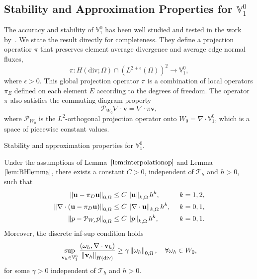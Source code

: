 \subsection{Stability and Approximation Properties for $\mathbb{V}_1^0$}
\label{sec:stabV10}
The accuracy and stability of $\mathbb{V}_1^0$ has been well studied and 
tested in the work by~\cite{directSerendipity}.
We state the result directly for completeness.
They define a projection operatior $\pi$ that preserves element average 
divergence and average edge normal fluxes,
\begin{equation}\label{eq:RT}
		  \pi : H(\text{div}; \Omega) \cap (L^{2+\epsilon}(\Omega))^2
		  \rightarrow \mathbb{V}_1^{0},
\end{equation}
where $\epsilon >0$. This global projection operator $\pi$ is a
combination of local operators $\pi_E$ defined on each element $E$
according to the degrees of freedom.
The operator $\pi$ also satisfies the commuting diagram property 
\begin{equation}
		  \mathcal{P}_{W_0} \nabla \cdot \mathbf{v} = \nabla \cdot \pi \mathbf{v},
\end{equation}
where $\mathcal{P}_{W_0}$ is the $L^2$-orthogonal projection operator onto
$W_0 = \nabla \cdot \mathbb{V}_1^0$, which is a space of piecewise 
constant values.
\begin{lem}\label{lem:theoryhdiv}
		  Stability and approximation properties for $\mathbb{V}_1^0$.

		  Under the assumptions of Lemma~$\ref{lem:interpolationop}$ and 
		  Lemma~$\ref{lem:BHlemma}$, there exists a 
		  constant $C>0$, independent of $\mathcal{T}_h$ and $h>0$, such that
		  \begin{equation}
					 \begin{alignedat}{2}
								\left\lVert\mathbf{u} - \pi_D \mathbf{u}\right\rVert_{0,\Omega} &\leq C \left\lVert\mathbf{u}\right\rVert_{k,\Omega}h^k, \hspace{0.8cm} &&k=1, 2, \\
								\left\lVert\nabla\cdot(\mathbf{u} - \pi_D \mathbf{u})\right\rVert_{0,\Omega} &\leq C \left\lVert\nabla \cdot \mathbf{u}\right\rVert_{k,\Omega}h^k, \hspace{0.5cm} &&k=0, 1,\\
								\left\lVert p - \mathcal{P}_{W_s} p \right\rVert_{0,\Omega} &\leq C \left\lVert p\right\rVert_{k,\Omega}h^k, \hspace{0.9cm} &&k=0, 1. 
		 \end{alignedat}
		  \end{equation}
		  Moreover, the discrete inf-sup condition holds
		  \begin{equation}
					 \sup_{\mathbf{v}_h \in \mathbb{V}_1^0} \frac{(\omega_h, \nabla \cdot \mathbf{v}_h)}{\left\lVert\mathbf{v}_h\right\rVert_{H(\text{div})}} \geq \gamma \left\lVert\omega_h\right\rVert_{0,\Omega}, \quad \forall \omega_h \in W_0,
		  \end{equation}
		  for some $\gamma > 0$ independent of $\mathcal{T}_h$ and $h>0$.
\end{lem}
